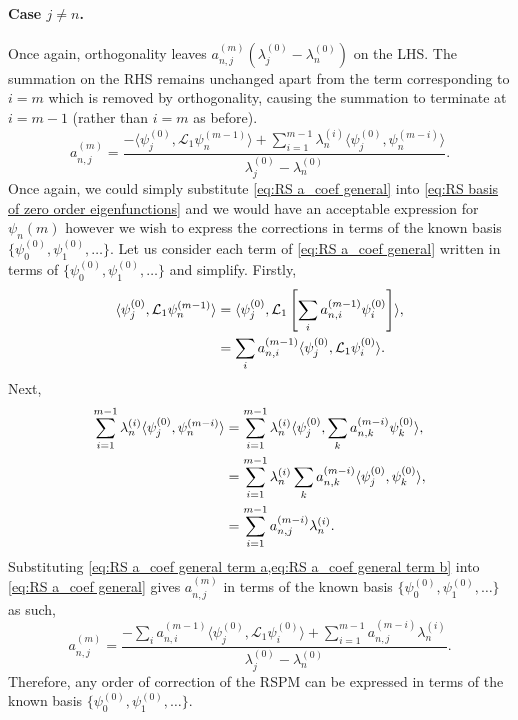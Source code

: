 \documentclass[11pt]{amsart}
\begin{document}
\paragraph{Case $j\neq n$.} Once again, orthogonality leaves $a_{n,j}^{(m)}(\lambda_j^{(0)}-\lambda_n^{(0)})$ on the LHS. The summation on the RHS remains unchanged apart from the term corresponding to $i=m$ which is removed by orthogonality, causing the summation to terminate at $i=m-1$ (rather than $i=m$ as before).
\begin{equation}
\label{eq:RS a_coef general}
     a_{n,j}^{(m)} = \frac{ - \langle\psi_j^{(0)},\mathcal{L}_1\psi_n^{(m-1)}\rangle  + \sum_{i=1}^{m-1} \lambda_n^{(i)} \langle\psi_j^{(0)},\psi_n^{(m-i)}\rangle }{\lambda_j^{(0)}-\lambda_n^{(0)}}.
\end{equation}
Once again, we could simply substitute \cref{eq:RS a_coef general} into \cref{eq:RS basis of zero order eigenfunctions} and we would have an acceptable expression for $\psi_n{(m)}$ however we wish to express the corrections in terms of the known basis $\{\psi_0^{(0)}, \psi_1^{(0)}, \dots\}$. Let us consider each term of \cref{eq:RS a_coef general} written in terms of $\{\psi_0^{(0)}, \psi_1^{(0)}, \dots\}$ and simplify. Firstly,
\begin{align}
    \langle\psi_j^{(0)},\mathcal{L}_1\psi_n^{(m-1)}\rangle &= \langle\psi_j^{(0)},\mathcal{L}_1 \left[ \sum_{i} a_{n,i}^{(m-1)}\psi_i^{(0)} \right]\rangle \notag,\\
    & = \sum_{i} a_{n,i}^{(m-1)}\langle\psi_j^{(0)},\mathcal{L}_1 \psi_i^{(0)}\rangle \label{eq:RS a_coef general term a}.
\end{align}
Next,
\begin{align}
    \sum_{i=1}^{m-1} \lambda_n^{(i)} \langle\psi_j^{(0)},\psi_n^{(m-i)}\rangle  & = \sum_{i=1}^{m-1} \lambda_n^{(i)} \langle\psi_j^{(0)},\sum_{k} a_{n,k}^{(m-i)}\psi_k^{(0)}\rangle \notag, \\
    & =\sum_{i=1}^{m-1} \lambda_n^{(i)}\sum_{k} a_{n,k}^{(m-i)} \langle\psi_j^{(0)},\psi_k^{(0)}\rangle \notag, \\
    & =\sum_{i=1}^{m-1}a_{n,j}^{(m-i)}  \lambda_n^{(i)}  . \label{eq:RS a_coef general term b}
\end{align}
Substituting \cref{eq:RS a_coef general term a,eq:RS a_coef general term b} into \cref{eq:RS a_coef general} gives $a_{n,j}^{(m)}$ in terms of the known basis $\{\psi_0^{(0)}, \psi_1^{(0)}, \dots\}$ as such,
\begin{equation*}
     a_{n,j}^{(m)} = \frac{ - \sum_{i} a_{n,i}^{(m-1)}\langle\psi_j^{(0)},\mathcal{L}_1 \psi_i^{(0)}\rangle  + \sum_{i=1}^{m-1}  a_{n,j}^{(m-i)} \lambda_n^{(i)}}{\lambda_j^{(0)}-\lambda_n^{(0)}}.
\end{equation*}
Therefore, any order of correction of the RSPM can be expressed in terms of the known basis $\{\psi_0^{(0)}, \psi_1^{(0)}, \dots\}$.
\end{document}
